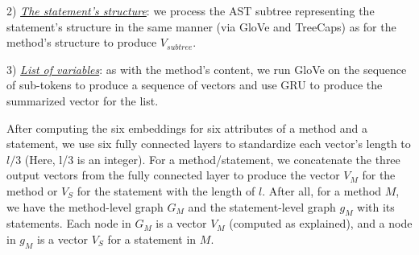 



2) {\em \underline{The statement's structure}}: we process the AST
subtree representing the statement's structure in the same manner (via
GloVe and TreeCaps) as for the method's structure to produce
$V_{subtree}$.



3) {\em \underline{List of variables}}: as with the method's content,
we run GloVe on the sequence of sub-tokens to produce a sequence of
vectors and use GRU to produce the summarized vector for the
list.





After computing the six embeddings for six attributes of a method and
a statement, we use six fully connected layers to standardize each
vector's length to $l/3$ (Here, l/3 is an integer). For a
method/statement, we concatenate the three output vectors from the
fully connected layer to produce the vector $V_{M}$ for the method or
$V_{S}$ for the statement with the length of $l$. After all, for a
method $M$, we have the method-level graph $G_{M}$ and the
statement-level graph $g_{M}$ with its statements. Each node in
$G_{M}$ is a vector $V_{M}$ (computed as explained), and a node in
$g_{M}$ is a vector $V_{S}$ for a statement in $M$.


